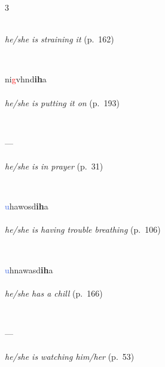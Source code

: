 \documentclass[oneside,openany]{book}%
\begin{document}
\begin{multicols}{3}
\begin{minipage}[t]{\linewidth}
\\
\noindent \textit{he/she is straining it} (p.~162)
\end{minipage}\\[1em]%
\begin{minipage}[t]{\linewidth}
\raggedright\noindent ni\textcolor{Red}{g}vhnd\textbf{ih}a\\
\\
\noindent \textit{he/she is putting it on} (p.~193)
\end{minipage}\\[1em]%
\begin{minipage}[t]{\linewidth}
\raggedright\noindent ---\\
\\
\noindent \textit{he/she is in prayer} (p.~31)
\end{minipage}\\[1em]%
\begin{minipage}[t]{\linewidth}
\raggedright\noindent \textcolor{RoyalBlue}{u}hawosd\textbf{ih}a\\
\\
\noindent \textit{he/she is having trouble breathing} (p.~106)
\end{minipage}\\[1em]%
\begin{minipage}[t]{\linewidth}
\raggedright\noindent \textcolor{RoyalBlue}{u}hnawasd\textbf{ih}a\\
\\
\noindent \textit{he/she has a chill} (p.~166)
\end{minipage}\\[1em]%
\begin{minipage}[t]{\linewidth}
\raggedright\noindent ---\\
\\
\noindent \textit{he/she is watching him/her} (p.~53)
\end{minipage}\\[1em]%
\begin{minipage}[t]{\linewidth}

\end{minipage}
\end{multicols}
\end{document}
